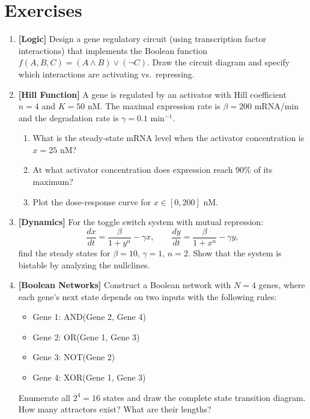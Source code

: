 \section{Exercises}
\label{sec:ch3-exercises}

\begin{enumerate}[label=\textbf{3.\arabic*.}, leftmargin=2.5em]

\item \textbf{[Logic]} Design a gene regulatory circuit (using transcription factor interactions) that implements the Boolean function $f(A, B, C) = (A \land B) \lor (\lnot C)$. Draw the circuit diagram and specify which interactions are activating vs.\ repressing.

\item \textbf{[Hill Function]} A gene is regulated by an activator with Hill coefficient $n = 4$ and $K = 50$ nM. The maximal expression rate is $\beta = 200$ mRNA/min and the degradation rate is $\gamma = 0.1$ min$^{-1}$.
  \begin{enumerate}[label=(\alph*)]
    \item What is the steady-state mRNA level when the activator concentration is $x = 25$ nM?
    \item At what activator concentration does expression reach 90\% of its maximum?
    \item Plot the dose-response curve for $x \in [0, 200]$ nM.
  \end{enumerate}

\item \textbf{[Dynamics]} For the toggle switch system with mutual repression:
  \begin{equation*}
    \frac{dx}{dt} = \frac{\beta}{1 + y^n} - \gamma x, \qquad \frac{dy}{dt} = \frac{\beta}{1 + x^n} - \gamma y,
  \end{equation*}
  find the steady states for $\beta = 10$, $\gamma = 1$, $n = 2$. Show that the system is bistable by analyzing the nullclines.

\item \textbf{[Boolean Networks]} Construct a Boolean network with $N=4$ genes, where each gene's next state depends on two inputs with the following rules:
  \begin{itemize}
    \item Gene 1: AND(Gene 2, Gene 4)
    \item Gene 2: OR(Gene 1, Gene 3)
    \item Gene 3: NOT(Gene 2)
    \item Gene 4: XOR(Gene 1, Gene 3)
  \end{itemize}
  Enumerate all $2^4 = 16$ states and draw the complete state transition diagram. How many attractors exist? What are their lengths?


\end{enumerate}
